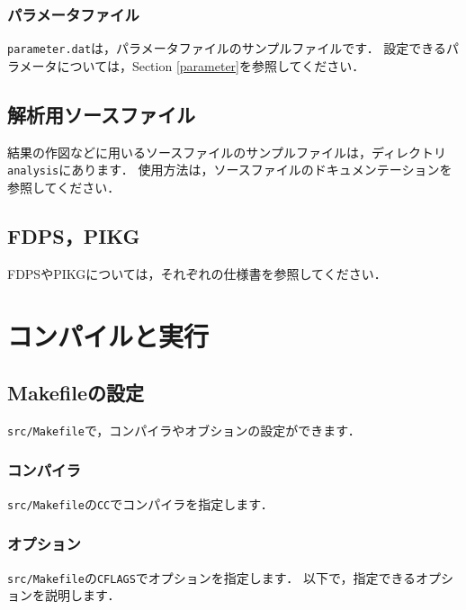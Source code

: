 \documentclass[12pt,a4paper,dvipdfmx]{jsarticle}
\newcommand{\ourcodeR}{GPLUM-2.5\xspace}
\begin{document}
\subsubsection{パラメータファイル}
\texttt{parameter.dat}は，パラメータファイルのサンプルファイルです．
設定できるパラメータについては，Section \ref{parameter}を参照してください．

\subsection{解析用ソースファイル}
結果の作図などに用いるソースファイルのサンプルファイルは，ディレクトリ\texttt{analysis}にあります．
使用方法は，ソースファイルのドキュメンテーションを参照してください．

\subsection{FDPS，PIKG}
FDPSやPIKGについては，それぞれの仕様書を参照してください．



\section{コンパイルと実行}

\subsection{Makefileの設定}

\texttt{src/Makefile}で，コンパイラやオブションの設定ができます．

\subsubsection{コンパイラ}
\texttt{src/Makefile}の\texttt{CC}でコンパイラを指定します．

\subsubsection{オプション}
\texttt{src/Makefile}の\texttt{CFLAGS}でオプションを指定します．
以下で，指定できるオプションを説明します．
\end{document}
